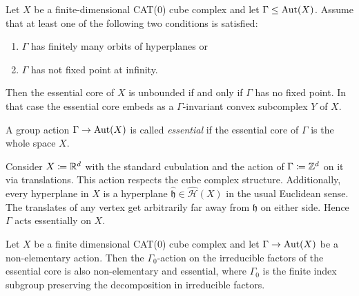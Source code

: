 \begin{prop}
  \label{prop:cs-3.5}
  Let \(X\) be a finite-dimensional CAT(0) cube complex and let \(\Gamma \leq \operatorname{Aut}(X)\). Assume that at least one of the following two conditions is satisfied:
  \begin{enumerate}
  \item \(\Gamma\) has finitely many orbits of hyperplanes or
  \item \(\Gamma\) has not fixed point at infinity.
  \end{enumerate}
  Then the essential core of \(X\) is unbounded if and only if \(\Gamma\) has no fixed point. In that case the essential core embeds as a \(\Gamma\)-invariant convex subcomplex \(Y\) of \(X\).
\end{prop}


\begin{defin}
  A group action \(\Gamma \to \operatorname{Aut}(X)\) is called \emph{essential} if the essential core of \(\Gamma\) is the whole space \(X\).
\end{defin}

\begin{bsp}
  Consider \(X\coloneqq \mathbb{R}^d\) with the standard cubulation and the action of \(\Gamma \coloneqq \mathbb{Z}^d\) on it via translations. This action respects the cube complex structure. Additionally, every hyperplane in \(X\) is a hyperplane \(\mathfrak{\hat h} \in \mathcal{\hat H}(X)\) in the usual Euclidean sense. The translates of any vertex get arbitrarily far away from \(\mathfrak{h}\) on either side. Hence \(\Gamma\) acts essentially on \(X\).
\end{bsp}

\begin{lemma}[{\cite[Lemma~2.28]{MR3509968}}]
  \label{lem:2.28}
  Let \(X\) be a finite dimensional CAT(0) cube complex and let \(\Gamma \to \operatorname{Aut}(X)\) be a non-elementary action. Then the \(\Gamma_0\)-action on the irreducible factors of the essential core is also non-elementary and essential, where \(\Gamma_0\) is the finite index subgroup preserving the decomposition in irreducible factors.
\end{lemma}


